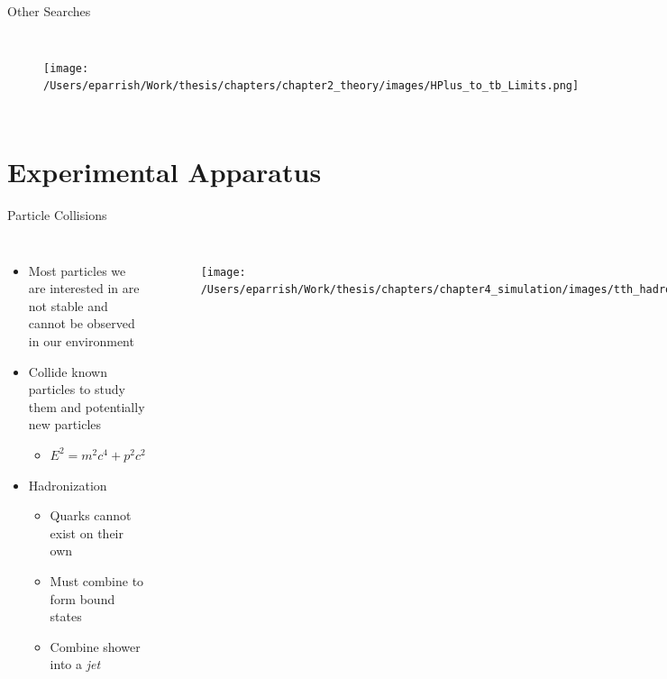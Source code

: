 \documentclass[aspectratio=169,xcolor=table]{beamer}
\begin{document}
    \begin{frame}[t]{Other \Hpm Searches}
    \begin{columns}
      \begin{figure}
      \texttt{[image: /Users/eparrish/Work/thesis/chapters/chapter2\_theory/images/HPlus\_to\_tb\_Limits.png]}
      \caption{\tiny \cite{Hpm-to-tb} }
      \end{figure}
      \begin{figure}
      \texttt{[image: /Users/eparrish/Work/thesis/chapters/chapter2\_theory/images/HPlus\_to\_cb\_Limits.png]}
      \caption{\tiny \cite{Hpm-to-cb} }
      \end{figure}
    \end{columns}
    \end{frame}

\section{Experimental Apparatus }

  \begin{frame}[t]{Particle Collisions}
    \begin{columns}[t]
        \begin{itemize}
          \item Most particles we are interested in are not stable and cannot be observed in our environment
          \item Collide known particles to study them and potentially new particles
            \begin{itemize}
              \item $E^2 = m^2c^4 + p^2c^2$
            \end{itemize}
          \item Hadronization
          \begin{itemize}
            \item Quarks cannot exist on their own
            \item Must combine to form bound states
            \item Combine shower into a \textit{jet}
          \end{itemize}
        \end{itemize}

        \begin{figure}
        \centering
        \texttt{[image: /Users/eparrish/Work/thesis/chapters/chapter4\_simulation/images/tth\_hadronization\_gen.png]}
        \caption{\tiny \cite{Wanotayaroj:2242196}}
        \end{figure}

    \end{columns}
  \end{frame}
\end{document}
